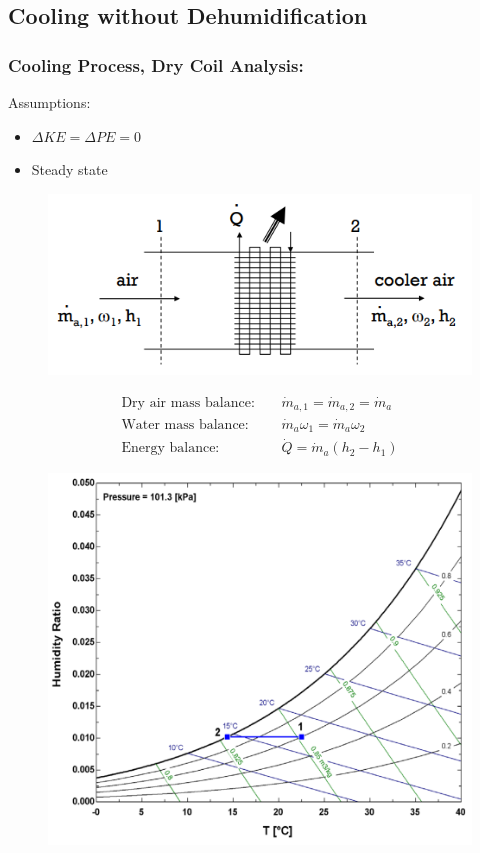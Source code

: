 \documentclass[class=report, crop=false, 12pt,a4paper]{standalone}
\numberwithin{equation}{section}
\begin{document}
\subsection*{Cooling without Dehumidification}
\subsubsection{Cooling Process, Dry Coil Analysis:}
Assumptions:
\begin{itemize}[noitemsep]
  \item $\Delta KE = \Delta PE = 0$
  \item Steady state
\end{itemize}
\begin{figure}[H]
  \centering
  \includegraphics[width = 0.75 \textwidth]{../img/diagram111.png}
  \caption{}
\end{figure}
\begin{align}
  \text{Dry air mass balance:} \ \ \ \ \ &\dot{m}_{a,1} = \dot{m}_{a,2} = \dot{m}_{a} \\[5pt]
  \text{Water mass balance:} \ \ \ \ \ &\dot{m}_{a}\omega_1 = \dot{m}_{a}\omega_2 \\[5pt]
  \text{Energy balance:} \ \ \ \ \ &\dot{Q} = \dot{m}_{a}(h_2-h_1)
\end{align}
\begin{figure}[H]
  \centering
  \includegraphics[width = 0.72 \textwidth]{../img/diagram112.png}
  \caption{}
\end{figure}
\end{document}
